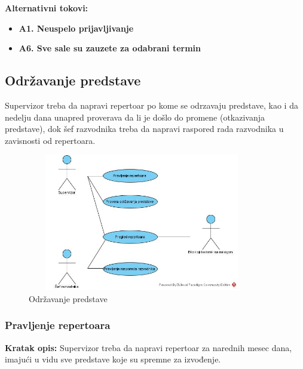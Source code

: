 \documentclass[a4paper]{article}
\begin{document}
\noindent\textbf{Alternativni tokovi:} 
\begin{itemize}
 \item \textbf{A1. Neuspelo prijavljivanje} 
       \item \textbf{A6. Sve sale su zauzete za odabrani termin} 
\end{itemize}

\subsection{Održavanje predstave}
  Supervizor treba da napravi repertoar po kome se odrzavaju predstave, kao i da nedelju dana unapred proverava da li je došlo do promene (otkazivanja predstave), dok šef razvodnika treba da napravi raspored rada razvodnika u zavisnosti od repertoara. 
  
\begin{figure}[H]
  \begin{center}
      \includegraphics[width=100mm,height=60mm]{../images/usecase_odrzavanje_predstave.jpg}
  \end{center}
  \caption{Održavanje predstave}
  \label{usecase_prodaja_karata}
\end{figure}


\subsubsection{Pravljenje repertoara} 
\noindent\textbf{Kratak opis:} Supervizor treba da napravi repertoar za narednih mesec dana, imajući u vidu sve predstave koje su spremne za izvođenje.
\end{document}
